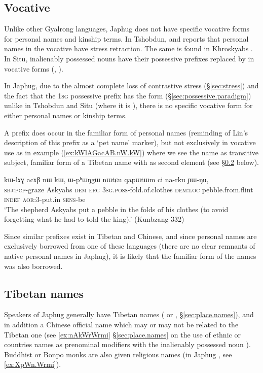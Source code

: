 \subsection{Vocative} \label{sec:vocative}
Unlike other Gyalrong languages, Japhug does not have specific vocative forms for personal names and kinship terms. In Tshobdun, \citet[133]{jackson98morphology} and \citet[53]{jackson05yingao} reports that personal names in the vocative have stress retraction. The same is found in Khroskyabs \citep[153]{lai17khroskyabs}. In Situ, inalienably possessed nouns have their possessive prefixes replaced by  in vocative forms (\citealt[471]{nagano03cogtse}, \citealt[177]{prins16kyomkyo}). 

In Japhug, due to the almost complete loss of contrastive stress (§\ref{sec:stress}) and the fact that the \textsc{1sg} possessive prefix has the form  (§\ref{sec:possessive.paradigm}) unlike in Tshobdun and Situ (where it is ), there is no specific vocative form for either personal names or kinship terms. 

A prefix  does occur in the familiar form of personal names (reminding of Lin's \citeyear[162]{linxr93jiarong} description of this prefix as a  `pet name' marker), but not exclusively in vocative use as in example (\ref{ex:kWlAGacAB.nW.kW}) where we see the name  as transitive subject, familiar form of a Tibetan name with  as second element (see §\ref{sec:names.tibet} below).

 \begin{exe}
\ex \label{ex:kWlAGacAB.nW.kW}
\gll kɯ-lɤɣ acɤβ nɯ kɯ, ɯ-pʰɯŋgɯ nɯtɕu qapɯtɯm ci na-rku ɲɯ-ŋu, \\
\textsc{sbj}:\textsc{pcp}-graze Askyabs \textsc{dem} \textsc{erg} \textsc{3sg}.\textsc{poss}-fold.of.clothes \textsc{dem}:\textsc{loc} pebble.from.flint \textsc{indef} \textsc{aor}:3\flobv{}-put.in \textsc{sens}-be \\
\glt `The shepherd Askyabs put a pebble in the folds of his clothes (to avoid forgetting what he had to told the king).' (Kunbzang 332)
\end{exe}

Since similar  prefixes exist in Tibetan and Chinese, and since personal names are exclusively borrowed from one of these languages (there are no clear remnants of native personal names in Japhug), it is likely that the familiar form of the names was also borrowed.

\subsection{Tibetan names} \label{sec:names.tibet}
Speakers of Japhug generally have Tibetan names ( or , §\ref{sec:place.names}), and in addition a Chinese official name which may or may not be related to the Tibetan one (see \ref{ex:nAkWrWrmi} §\ref{sec:place.names} on the use of ethnic or countries names as prenominal modifiers with the inalienably possessed noun ). Buddhist or Bonpo monks are also given religious names (in Japhug , see \ref{ex:XpWn.Wrmi}). 
 
